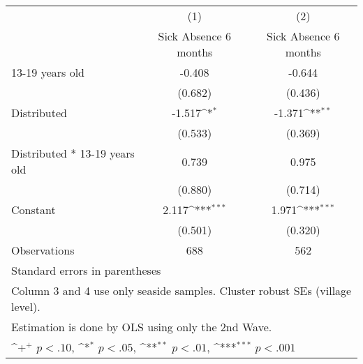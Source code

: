 {
\def\sym#1{\ifmmode^{#1}\else\(^{#1}\)\fi}
\begin{tabular}{l*{2}{c}}
\hline\hline
                    &\multicolumn{1}{c}{(1)}&\multicolumn{1}{c}{(2)}\\
                    &\multicolumn{1}{c}{Sick Absence 6 months}&\multicolumn{1}{c}{Sick Absence 6 months}\\
\hline
13-19 years old     &      -0.408         &      -0.644         \\
                    &     (0.682)         &     (0.436)         \\
[1em]
Distributed         &      -1.517\sym{*}  &      -1.371\sym{**} \\
                    &     (0.533)         &     (0.369)         \\
[1em]
Distributed * 13-19 years old&       0.739         &       0.975         \\
                    &     (0.880)         &     (0.714)         \\
[1em]
Constant            &       2.117\sym{***}&       1.971\sym{***}\\
                    &     (0.501)         &     (0.320)         \\
\hline
Observations        &         688         &         562         \\
\hline\hline
\multicolumn{3}{l}{\footnotesize Standard errors in parentheses}\\
\multicolumn{3}{l}{\footnotesize Column 3 and 4 use only seaside samples. Cluster robust SEs (village level).}\\
\multicolumn{3}{l}{\footnotesize Estimation is done by OLS using only the 2nd Wave.}\\
\multicolumn{3}{l}{\footnotesize \sym{+} \(p<.10\), \sym{*} \(p<.05\), \sym{**} \(p<.01\), \sym{***} \(p<.001\)}\\
\end{tabular}
}
